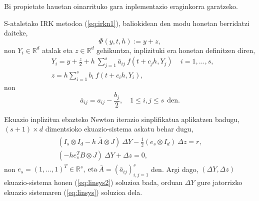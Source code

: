 Bi propietate hauetan oinarrituko gara inplementazio eraginkorra garatzeko.

S-ataletako IRK metodoa (\ref{eq:irkn1}), baliokidean den modu honetan berridatzi daiteke,
\begin{equation}
\Phi(y,t,h):=y+z,
\end{equation}
non $Y_i \in \mathbb{R}^d$ atalak eta $z \in \mathbb{R}^d$ gehikuntza, inplizituki era honetan definitzen diren,
\begin{align}
&Y_{i}=y+\frac{z}{2}+ h\ \sum^s_{j=1}{\bar{a}_{ij}\ f(t+c_jh,Y_{j})}\ \ \ \ \ i=1 ,\dots, s,\\
&z=h \sum_{i=1}^{s} {b_i \ f(t+c_ih,Y_{i})},
\end{align} 
non
\begin{equation}
\bar{a}_{ij}=a_{ij}-\frac{b_j}{2}, \quad 1\leqslant i,j \leqslant s \ \ \text{den}.
\end{equation} 

Ekuazio inplizitua ebazteko Newton iterazio sinplifikatua aplikatzen badugu, $(s+1) \times d$ dimentsioko ekuazio-sistema askatu behar dugu,
\begin{align}
\label{eq:linsys2}
\begin{split}
(I_s \otimes I_d- h \ \bar{A} \otimes J) \ \Delta Y - \frac{1}{2}(e_s \otimes I_d) \ \Delta z =r,\\
(-h e_s^T B \otimes J) \ \Delta Y+  \Delta z=0,
\end{split}
\end{align}
non $e_s=(1,\dots,1)^T \in \mathbb{R}^{s}, \ \text{eta} \ \bar{A}=(\bar{a}_{ij})_{i,j=1}^s$ den. Argi dago, $(\Delta Y, \Delta z)$ ekuazio-sistema honen (\ref{eq:linsys2}) soluzioa bada, orduan $\Delta Y$ gure jatorrizko ekuazio sistemaren (\ref{eq:linsys}) soluzioa dela.

